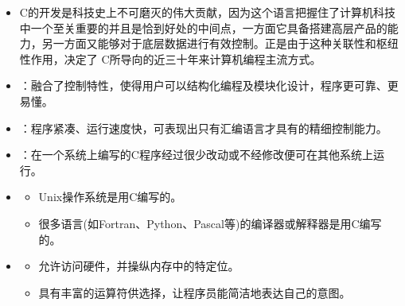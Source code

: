 \begin{frame}

\end{frame}

\begin{frame}
  \begin{itemize}
  \item
    C的开发是科技史上不可磨灭的伟大贡献，因为这个语言把握住了计算机科技中一个至关重要的并且是恰到好处的中间点，一方面它具备搭建高层产品的能力，另一方面又能够对于底层数据进行有效控制。正是由于这种关联性和枢纽性作用，决定了 C所导向的近三十年来计算机编程主流方式。
  \end{itemize}

\end{frame}

\begin{frame}
  \begin{free}[C语言的优点]{}
  \begin{itemize}
  \item {}：融合了控制特性，使得用户可以结构化编程及模块化设计，程序更可靠、更易懂。\\[0.05in]
    
  \item {}：程序紧凑、运行速度快，可表现出只有汇编语言才具有的精细控制能力。\\[0.05in] 
    
  \item {}：在一个系统上编写的C程序经过很少改动或不经修改便可在其他系统上运行。\\[0.05in]
    
  \item {}
    \begin{itemize}
    \item  Unix操作系统是用C编写的。  
    \item  很多语言(如Fortran、Python、Pascal等)的编译器或解释器是用C编写的。
    \end{itemize} \vspace{.05in}

  \item {}
    \begin{itemize}
    \item 允许访问硬件，并操纵内存中的特定位。 
    \item 具有丰富的运算符供选择，让程序员能简洁地表达自己的意图。
    \end{itemize}
  \end{itemize}
  \end{free}
\end{frame}



